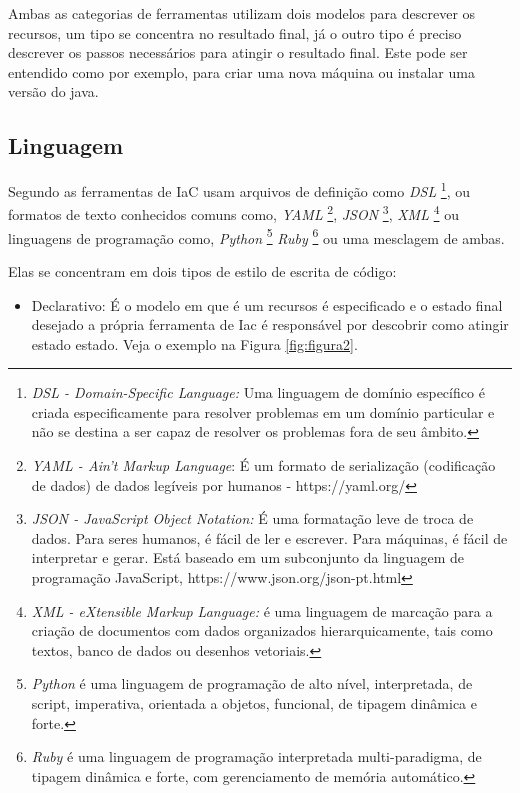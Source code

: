 Ambas as categorias de ferramentas utilizam dois modelos para descrever os recursos, um tipo se concentra no resultado final, já o outro tipo é preciso descrever os passos necessários para atingir o resultado final. Este pode ser entendido como por exemplo, para criar uma nova máquina ou instalar uma versão do java.

\subsection{Linguagem}

Segundo  as ferramentas de IaC usam arquivos de definição como \textit{DSL} \footnote{\textit{DSL - Domain-Specific Language:} Uma linguagem de domínio específico é criada especificamente para resolver problemas em um domínio particular e não se destina a ser capaz de resolver os problemas fora de seu âmbito. }, ou formatos de texto conhecidos comuns como, \textit{ YAML} \footnote{\textit{YAML - Ain't  Markup Language}: É um formato de serialização (codificação de dados) de dados legíveis por humanos -  https://yaml.org/ }, \textit{JSON} \footnote{\textit{JSON - JavaScript Object Notation:} É uma formatação leve de troca de dados. Para seres humanos, é fácil de ler e escrever. Para máquinas, é fácil de interpretar e gerar. Está baseado em um subconjunto da linguagem de programação JavaScript, https://www.json.org/json-pt.html}, \textit{XML} \footnote{\textit{XML - eXtensible Markup Language:} é uma linguagem de marcação para a criação de documentos com dados organizados hierarquicamente, tais como textos, banco de dados ou desenhos vetoriais.}
  ou linguagens de programação como, \textit{Python} \footnote{\textit{Python} é uma linguagem de programação de alto nível, interpretada, de script, imperativa, orientada a objetos, funcional, de tipagem dinâmica e forte.}  \textit{Ruby} \footnote{\textit{Ruby} é uma linguagem de programação interpretada multi-paradigma, de tipagem dinâmica e forte, com gerenciamento de memória automático.}  ou uma mesclagem de ambas.
  
  Elas se concentram em dois tipos de estilo de escrita de código: 
   \begin{itemize}
       \item Declarativo: É o modelo em que é um recursos é especificado e o estado final desejado a própria ferramenta de Iac é responsável por descobrir como atingir estado estado. Veja o exemplo na Figura \ref{fig:figura2}.
   \end{itemize}

